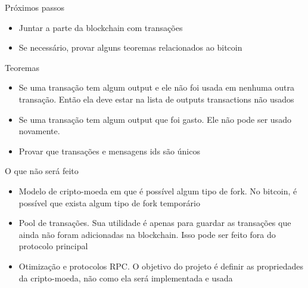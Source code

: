 \documentclass{beamer}
\begin{document}
  \begin{frame}{Próximos passos}
    \begin{itemize}
        \item Juntar a parte da blockchain com transações
        \item Se necessário, provar alguns teoremas relacionados ao bitcoin
    \end{itemize}
  \end{frame}
  
  \begin{frame}{Teoremas}
    \begin{itemize}
        \item Se uma transação tem algum output e ele não foi usada em nenhuma outra transação. Então ela deve estar na lista de outputs transactions não usados
        \item Se uma transação tem algum output que foi gasto. Ele não pode ser usado novamente.
        \item Provar que transações e mensagens ids são únicos
    \end{itemize}
  \end{frame}
  
  \begin{frame}{O que não será feito}
    \begin{itemize}
      \item Modelo de cripto-moeda em que é possível algum tipo de fork. No bitcoin, é possível que exista algum tipo de fork temporário
      \item Pool de transações. Sua utilidade é apenas para guardar as transações que ainda não foram adicionadas na blockchain. 
      Isso pode ser feito fora do protocolo principal
      \item Otimização e protocolos RPC. O objetivo do projeto é definir as propriedades da cripto-moeda, não como ela será implementada e usada
    \end{itemize}
  \end{frame}
\end{document}
